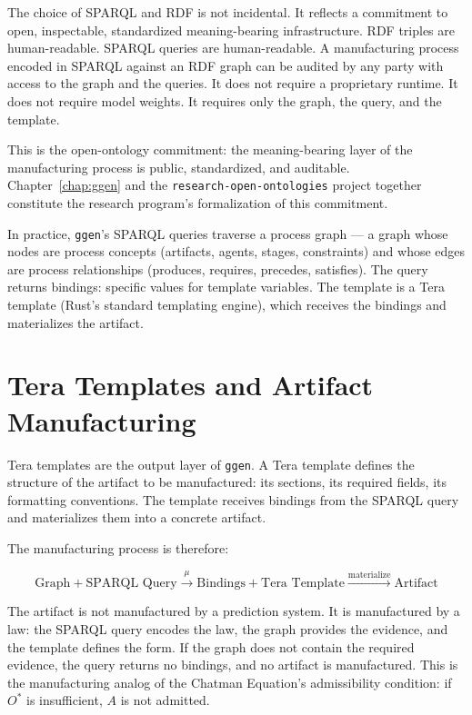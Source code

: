 The choice of SPARQL and RDF is not incidental. It reflects a commitment to open, inspectable, standardized meaning-bearing infrastructure. RDF triples are human-readable. SPARQL queries are human-readable. A manufacturing process encoded in SPARQL against an RDF graph can be audited by any party with access to the graph and the queries. It does not require a proprietary runtime. It does not require model weights. It requires only the graph, the query, and the template.

This is the open-ontology commitment: the meaning-bearing layer of the manufacturing process is public, standardized, and auditable. Chapter~\ref{chap:ggen} and the \texttt{research-open-ontologies} project together constitute the research program's formalization of this commitment.

In practice, \texttt{ggen}'s SPARQL queries traverse a process graph --- a graph whose nodes are process concepts (artifacts, agents, stages, constraints) and whose edges are process relationships (produces, requires, precedes, satisfies). The query returns bindings: specific values for template variables. The template is a Tera template (Rust's standard templating engine), which receives the bindings and materializes the artifact.

\section{Tera Templates and Artifact Manufacturing}

Tera templates are the output layer of \texttt{ggen}. A Tera template defines the structure of the artifact to be manufactured: its sections, its required fields, its formatting conventions. The template receives bindings from the SPARQL query and materializes them into a concrete artifact.

The manufacturing process is therefore:

\[
\text{Graph} + \text{SPARQL Query} \xrightarrow{\mu} \text{Bindings} + \text{Tera Template} \xrightarrow{\text{materialize}} \text{Artifact}
\]

The artifact is not manufactured by a prediction system. It is manufactured by a law: the SPARQL query encodes the law, the graph provides the evidence, and the template defines the form. If the graph does not contain the required evidence, the query returns no bindings, and no artifact is manufactured. This is the manufacturing analog of the Chatman Equation's admissibility condition: if $O^{*}$ is insufficient, $A$ is not admitted.

